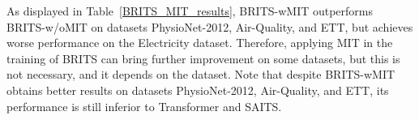 \documentclass{article}
\begin{document}
As displayed in Table~\ref{BRITS_MIT_results}, BRITS-wMIT outperforms BRITS-w/oMIT on datasets PhysioNet-2012, Air-Quality, and ETT, but achieves worse performance on the Electricity dataset. Therefore, applying MIT in the training of BRITS can bring further improvement on some datasets, but this is not necessary, and it depends on the dataset. Note that despite BRITS-wMIT obtains better results on datasets PhysioNet-2012, Air-Quality, and ETT, its performance is still inferior to Transformer and SAITS.	
\end{document}
